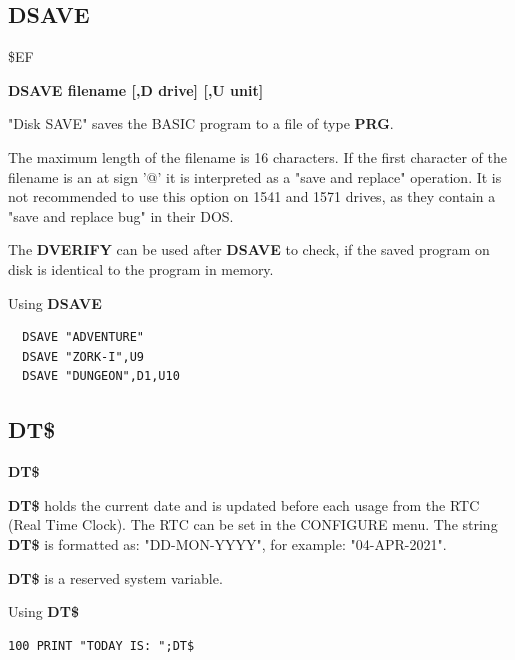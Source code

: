 \subsection{DSAVE}
\begin{description}[leftmargin=2cm,style=nextline]
\item [Token:] \$EF
\item [Format:] {\bf DSAVE filename [,D drive] [,U unit] }
\item [Usage:]
   "Disk SAVE" saves the BASIC program to
   a file of type {\bf PRG}.

   \filenamedefinition
   The maximum length of the filename is 16 characters.
   If the first character of the filename is an at sign '@' it
   is interpreted as a "save and replace" operation. It is not recommended
   to use this option on 1541 and 1571 drives, as they
   contain a "save and replace bug" in their DOS.

   \drivedefinition

   \unitdefinition

\item [Remarks:]
   The {\bf DVERIFY} can be used after {\bf DSAVE} to check,
   if the saved program on disk is identical to the program
   in memory.

\item [Example:] Using {\bf DSAVE}
\begin{tcolorbox}[colback=black,coltext=white]
\verbatimfont{\codefont}
\begin{verbatim}
  DSAVE "ADVENTURE"
  DSAVE "ZORK-I",U9
  DSAVE "DUNGEON",D1,U10
\end{verbatim}
\end{tcolorbox}
\end{description}


\newpage
\subsection{DT\$}
\begin{description}[leftmargin=2cm,style=nextline]
\item [Format:] {\bf DT\$}
\item [Usage:]  {\bf DT\$} holds the current date and is updated before
                each usage from the RTC (Real Time Clock).
                The RTC can be set in the CONFIGURE menu.
                The string {\bf DT\$} is formatted as:
                "DD-MON-YYYY", for example: "04-APR-2021".
\item[Remarks:] {\bf DT\$} is a reserved system variable.

\item [Example:] Using {\bf DT\$}
\begin{tcolorbox}[colback=black,coltext=white]
\verbatimfont{\codefont}
\begin{verbatim}
100 PRINT "TODAY IS: ";DT$
\end{verbatim}
\end{tcolorbox}
\end{description}

